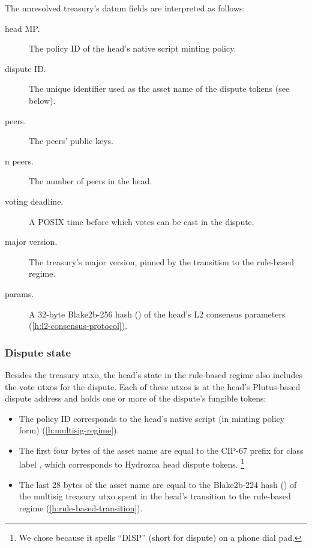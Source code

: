 \documentclass[../hydrozoa.tex]{subfiles}
\begin{document}
The unresolved treasury's datum fields are interpreted as follows:
\begin{description}
  \item[head MP.] The policy ID of the head's native script minting policy.
  \item[dispute ID.] The unique identifier used as the asset name of the dispute tokens (see below).
  \item[peers.] The peers' public keys.
  \item[n peers.] The number of peers in the head.
  \item[voting deadline.] A POSIX time before which votes can be cast in the dispute.
  \item[major version.] The treasury's major version, pinned by the transition to the rule-based regime.
  \item[params.] A 32-byte Blake2b-256 hash () of the head's L2 consensus parameters (\cref{h:l2-consensus-protocol}).
\end{description}

\subsubsection{Dispute state}

Besides the treasury utxo, the head's state in the rule-based regime also includes the vote utxos for the dispute.
Each of these utxos is at the head's Plutus-based dispute address and holds one or more of the dispute's fungible tokens:
\begin{itemize}
  \item The policy ID corresponds to the head's native script (in minting policy form) (\cref{h:multisig-regime}).
  \item The first four bytes of the asset name are equal to the CIP-67
    \citep{AlessandroKonradThomasVellekoopCIP67AssetName2022}
    prefix for class label , which corresponds to Hydrozoa head dispute tokens.%
    \footnote{We chose  because it spells ``DISP'' (short for dispute) on a phone dial pad.}
  \item The last 28 bytes of the asset name are equal to the Blake2b-224 hash () of the multisig treasury utxo spent in the head's transition to the rule-based regime (\cref{h:rule-based-transition}).
\end{itemize}
\end{document}
